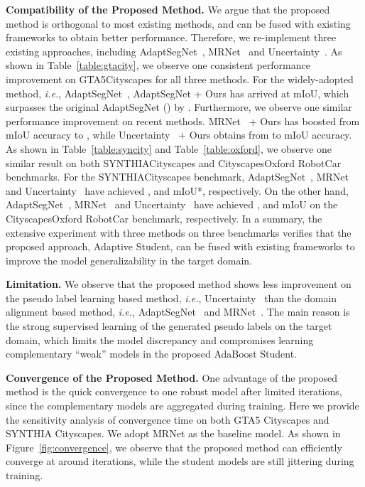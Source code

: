 \documentclass[journal]{IEEEtran}
\def\ie{\emph{i.e.}}
\begin{document}
\noindent\textbf{Compatibility of the Proposed Method.} 
We argue that the proposed method is orthogonal to most existing methods, and can be fused with existing frameworks to obtain better performance. 
Therefore, we re-implement three existing approaches, including AdaptSegNet~\cite{tsai2018learning}, MRNet~\cite{zheng2019unsupervised} and Uncertainty~\cite{zheng2020unsupervised}. As shown in Table~\ref{table:gtacity}, we observe one consistent performance improvement on GTA5Cityscapes for all three methods. For the widely-adopted method, \ie, AdaptSegNet~\cite{tsai2018learning}, AdaptSegNet + Ours has arrived at  mIoU, which surpasses the original AdaptSegNet () by . 
Furthermore, we observe one similar performance improvement on recent methods. MRNet~\cite{zheng2019unsupervised} + Ours has boosted from  mIoU accuracy to , while Uncertainty~\cite{zheng2020unsupervised} + Ours obtains  from  to  mIoU accuracy.   
As shown in Table~\ref{table:syncity} and Table~\ref{table:oxford}, we observe one similar result on both SYNTHIACityscapes and CityscapesOxford RobotCar benchmarks. For the SYNTHIACityscapes benchmark, AdaptSegNet~\cite{tsai2018learning}, MRNet~\cite{zheng2019unsupervised} and Uncertainty~\cite{zheng2020unsupervised} have achieved ,  and  mIoU*, respectively.
On the other hand, AdaptSegNet~\cite{tsai2018learning}, MRNet~\cite{zheng2019unsupervised} and Uncertainty~\cite{zheng2020unsupervised} have achieved ,  and  mIoU on the CityscapesOxford RobotCar benchmark, respectively.
In a summary, the extensive experiment with three methods on three benchmarks verifies that the proposed approach, Adaptive Student, can be fused with existing frameworks to improve the model generalizability in the target domain.

\noindent\textbf{Limitation.} We observe that the proposed method shows less improvement on the pseudo label learning based method, \ie, Uncertainty~\cite{zheng2020unsupervised} than the domain alignment based method, \ie, AdaptSegNet~\cite{tsai2018learning} and MRNet~\cite{zheng2019unsupervised}. The main reason is the strong supervised learning of the generated pseudo labels on the target domain, which limits the model discrepancy and compromises learning complementary ``weak'' models in the proposed AdaBoost Student.

\noindent\textbf{Convergence of the Proposed Method.}
One advantage of the proposed method is the quick convergence to one robust model after limited iterations, since the complementary models are aggregated during training. Here we provide the sensitivity analysis of convergence time on both GTA5  Cityscapes and SYNTHIA  Cityscapes. We adopt MRNet as the baseline model. As shown in Figure~\ref{fig:convergence}, we observe that the proposed method can efficiently converge at around  iterations, while the student models are still jittering during training. 
\end{document}
